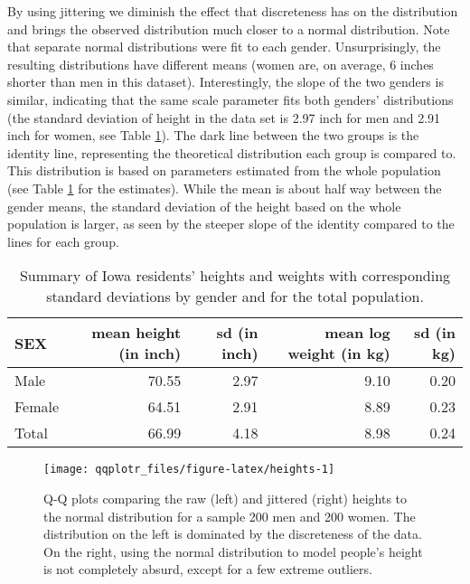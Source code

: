 By using jittering we diminish the effect that discreteness has on the
distribution and brings the observed distribution much closer to a
normal distribution. Note that separate normal distributions were fit to
each gender.
Unsurprisingly, the resulting distributions have different means (women
are, on average, 6 inches shorter than men in this dataset).
Interestingly, the slope of the two genders is similar, indicating that
the same scale parameter fits both genders' distributions (the standard
deviation of height in the data set is 2.97 inch for men and 2.91 inch
for women, see Table \ref{tab:heights}). The dark line between the two
groups is the identity line, representing the theoretical distribution
each group is compared to. This distribution is based on parameters
estimated from the whole population (see Table \ref{tab:heights} for the
estimates). While the mean is about half way between the gender means,
the standard deviation of the height based on the whole population is
larger, as seen by the steeper slope of the identity compared to the
lines for each group.

\begin{table}

\caption{\label{tab:heights-table}Summary of Iowa residents' heights and weights with corresponding standard deviations by gender and for the total population.\label{tab:heights}}
\centering
\begin{tabular}[t]{lrrrr}
\toprule
SEX & mean height (in inch) & sd (in inch) & mean log weight (in kg) & sd (in kg)\\
\midrule
Male & 70.55 & 2.97 & 9.10 & 0.20\\
Female & 64.51 & 2.91 & 8.89 & 0.23\\
Total & 66.99 & 4.18 & 8.98 & 0.24\\
\bottomrule
\end{tabular}
\end{table}

\begin{Schunk}
\begin{figure}

{\centering \texttt{[image: qqplotr\_files/figure-latex/heights-1]} 

}

\caption[Q-Q plots comparing the raw (left) and jittered (right) heights to the normal distribution for a sample 200 men and 200 women]{Q-Q plots comparing the raw (left) and jittered (right) heights to the normal distribution for a sample 200 men and 200 women. The distribution on the left is dominated by the discreteness of the data. On the right, using the normal distribution to model people's height is not completely absurd, except for a few extreme outliers.}\label{fig:heights}
\end{figure}
\end{Schunk}

